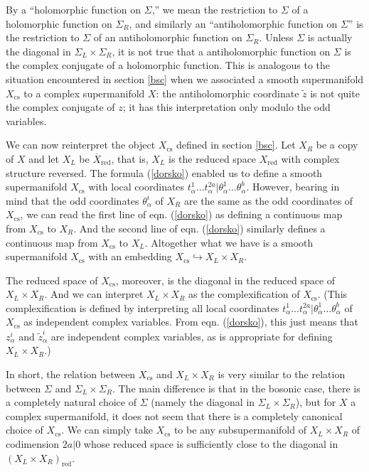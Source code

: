 \documentclass[11pt,a4paper]{article}
\def\t{{ \sf t}}
\def\cs{{\mathrm{cs}}}
\def\tilde{\widetilde}
\def\red{{\mathrm{red}}}
\def\t{\tilde }
\def\tilde{\widetilde}
\def\bar{\overline}
\begin{document}
By a ``holomorphic function on $\Sigma$,'' we mean the restriction
to $\Sigma$ of a holomorphic function on $\Sigma_R$, and similarly an ``antiholomorphic function on $\Sigma$'' is the restriction to $\Sigma$
of an antiholomorphic function on $\Sigma_R$.  Unless $\Sigma$ is actually the diagonal in $\Sigma_L\times \Sigma_R$, it is not true
that a antiholomorphic function on $\Sigma$ is the complex conjugate of a holomorphic function.  This is analogous to the situation encountered in section
\ref{bsc} when we associated a smooth supermanifold $X_\cs$ to a complex supermanifold $X$: the antiholomorphic coordinate $\t z$ is
not quite the complex conjugate of $z$; it has this interpretation only modulo the odd variables.

We can now reinterpret the object $X_\cs$ defined in section \ref{bsc}.  Let $X_R$ be a copy of $X$ and let $X_L$ be $\bar X_\red$, that is, $X_L$ is the reduced space $X_\red$
with complex structure reversed.  The formula (\ref{dorsko}) enabled us to define a smooth supermanifold $X_\cs$ with local coordinates
$t^1_\alpha\dots t^{2a}_\alpha|\theta^1_\alpha\dots \theta^b_\alpha$.  However, bearing in mind that the odd coordinates
$\theta^i_\alpha$ of $X_R$ are the same as the odd coordinates of $X_\cs$, we can read the first line of eqn. (\ref{dorsko}) as defining
a continuous map from $X_\cs$ to $X_R$.  And the second line of eqn. (\ref{dorsko}) similarly defines a continuous map from $X_\cs$ to $X_L$.
Altogether what we have is a smooth supermanifold $X_\cs$ with an embedding $X_\cs\hookrightarrow X_L\times X_R$.

The reduced space of $X_\cs$, moreover, is the diagonal in the reduced space of $X_L\times X_R$.  And we can interpret $X_L\times X_R$
as the complexification of $X_\cs$.  (This complexification is defined by interpreting all local coordinates $t^1_\alpha \dots t^{2a}_\alpha|\theta^1_\alpha
\dots \theta^b_\alpha$ of $X_\cs$ as independent complex variables.  From eqn. (\ref{dorsko}), this just means that 
$z^i_\alpha$ and $\t z^i_\alpha$ are independent complex variables, as is appropriate for defining $X_L\times X_R$.)  

In short, the relation between $X_\cs$ and $X_L\times X_R$ is very similar to the relation between $\Sigma$ and $\Sigma_L\times \Sigma_R$.
The main difference is that in the bosonic case, there is a completely natural choice of $\Sigma$ (namely the diagonal in $\Sigma_L\times \Sigma_R$),
but for $X$ a complex supermanifold, it does not seem that there is a completely canonical choice of $X_\cs$.  We can simply take
$X_\cs$ to be any subsupermanifold of $X_L\times X_R$ of codimension $2a|0$ whose reduced space is sufficiently close to
the diagonal in $(X_L\times X_R)_\red$.  
\end{document}
